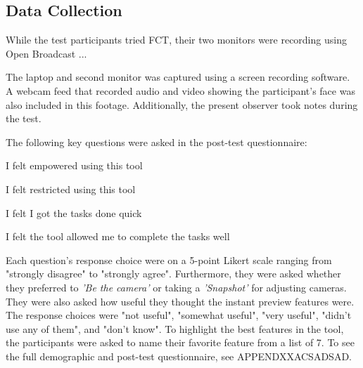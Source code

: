 \subsection{Data Collection}
While the test participants tried FCT, their two monitors were recording using Open Broadcast ...


The laptop and second monitor was captured using a screen recording software. A webcam feed  that recorded audio and video showing the participant's face was also included in this footage. Additionally, the present observer took notes during the test.

The following key questions were asked in the post-test questionnaire:

\setlength{\parindent}{1cm}
I felt empowered using this tool

\setlength{\parskip}{0pt}
I felt restricted using this tool

I felt I got the tasks done quick

I felt the tool allowed me to complete the tasks well

\setlength{\parskip}{15pt}
\setlength{\parindent}{0cm}
Each question's response choice were on a 5-point Likert scale ranging from "strongly disagree" to "strongly agree". Furthermore, they were asked whether they preferred to \textit{'Be the camera'} or taking a \textit{'Snapshot'} for adjusting cameras. They were also asked how useful they thought the instant preview features were. The response choices were "not useful", "somewhat useful", "very useful", "didn't use any of them", and "don't know". To highlight the best features in the tool, the participants were asked to name their favorite feature from a list of 7. To see the full demographic and post-test questionnaire, see APPENDXXACSADSAD. 

